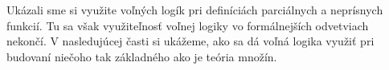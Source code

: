 \documentclass[12pt, letterpaper]{article}
\begin{document}
Ukázali sme si využite voľných logík pri definíciách parciálnych a neprísnych funkcií. Tu sa však využiteľnosť voľnej logiky vo formálnejších odvetviach nekončí. V nasledujúcej časti si ukážeme, ako sa dá voľná logika využiť pri budovaní niečoho tak základného ako je teória množín.  

\end{document}
